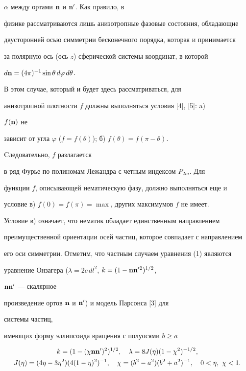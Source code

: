 $\alpha$ между ортами $\bold n$ и $\bold n'$. Как правило, в 


физике рассматриваются лишь анизотропные фазовые состояния, обладающие 


двусторонней осью симметрии бесконечного порядка, которая и принимается 


за полярную ось (ось $z$) сферической системы координат, в которой


$d\bold n=(4\pi)^{-1}\sin\theta\, d\varphi\,d\theta$.


В этом случае, который и будет здесь рассматриваться, для


анизотропной плотности $f$ должны выполняться условия [4], [5]: a) 


$f(\bold n)$ не


зависит от угла $\varphi$ ($f=f(\theta)$); б) $f(\theta)=f(\pi-\theta)$.


Cледовательно, $f$ разлагается 


в ряд Фурье по полиномам Лежандра с четным индексом $P_{2m}$. Для 


функции $f$, описывающей нематическую фазу, должно выполняться еще и 


условие в) $f(0)=f(\pi)=\max$, других максимумов $f$ не имеет.





Условие в) означает, что нематик обладает единственным направлением 


преимущественной ориентации осей частиц, которое совпадает с направлением 


его оси симметрии. Отметим, что частным случаем уравнения (1) являются 


уравнение Онзагера ($\lambda=2c\,dl^2$, $k=(1-\bold n\bold n'{}^2)^{1/2}$, 


$\bold n\bold n'$ --- скалярное


произведение ортов $\bold n$ и $\bold n'$) и модель Парсонса [3] для 


системы частиц,


имеющих форму эллипсоида вращения с полуосями $b\ge a$


\begin{gather}


k=(1-(\chi\bold n\bold n')^2)^{1/2},\quad


\lambda=8J(\eta)(1-\chi^2)^{-1/2},\\


%


J(\eta)=(4\eta-3\eta^2)(4(1-\eta)^2)^{-1},\quad


\chi=(b^2-a^2)(b^2+a^2)^{-1},\quad 0<\eta,\ \chi<1.\notag


\end{gather}


